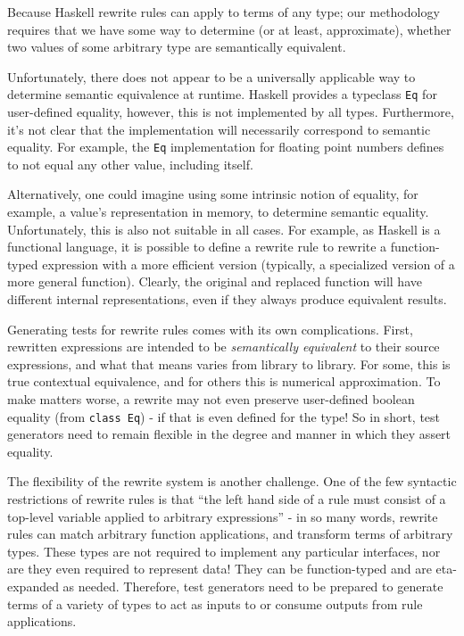 Because Haskell rewrite rules can apply to terms of any type; our methodology
requires that we have some way to determine (or at least, approximate), whether
two values of some arbitrary type are semantically equivalent.

Unfortunately, there does not appear to be a universally applicable way to
determine semantic equivalence at runtime. Haskell provides a typeclass
\texttt{Eq} for user-defined equality, however, this is not implemented by all
types. Furthermore, it's not clear that the implementation will necessarily
correspond to semantic equality. For example, the \texttt{Eq} implementation for
floating point numbers defines \NaN to not equal any other value, including itself.

Alternatively, one could imagine using some intrinsic notion of equality, for
example, a value's representation in memory, to determine semantic equality.
Unfortunately, this is also not suitable in all cases. For example, as Haskell
is a functional language, it is possible to define a rewrite rule to rewrite a
function-typed expression with a more efficient version (typically, a
specialized version of a more general function). Clearly, the original and
replaced function will have different internal representations, even if they
always produce equivalent results.


Generating tests for rewrite rules comes with its own complications. First, rewritten expressions are intended to be \textit{semantically equivalent} to their source expressions, and what that means varies from library to library. For some, this is true contextual equivalence, and for others this is numerical approximation. To make matters worse, a rewrite may not even preserve user-defined boolean equality (from \texttt{class Eq}) - if that is even defined for the type! So in short, test generators need to remain flexible in the degree and manner in which they assert equality.

The flexibility of the rewrite system is another challenge. One of the few syntactic restrictions of rewrite rules is that ``the left hand side of a rule must consist of a top-level variable applied to arbitrary expressions'' \cite{userguide} - in so many words, rewrite rules can match arbitrary function applications, and transform terms of arbitrary types. These types are not required to implement any particular interfaces, nor are they even required to represent data! They can be function-typed and are eta-expanded as needed. Therefore, test generators need to be prepared to generate terms of a variety of types to act as inputs to or consume outputs from rule applications.

